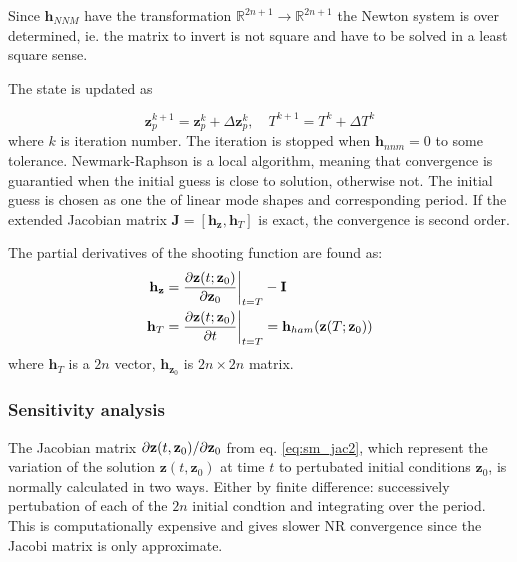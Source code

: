 Since $\bm h_{NNM}$ have the transformation $\mathbb{R}^{2n+1} \rightarrow
\mathbb{R}^{2n+1}$ the Newton system is over determined, ie. the matrix to
invert is not square and have to be solved in a least square sense.

The state is updated as

\begin{equation}
  \label{eq:sm_nr_update}
  \bm z^{k+1}_{p} = \bm z^k_{p} + \Delta \bm z^k_{p}, \quad
  T^{k+1} = T^k + \Delta T^k
\end{equation}
where $k$ is iteration number. The iteration is stopped when $\bm h_{nnm} = 0$
to some tolerance. Newmark-Raphson is a local algorithm, meaning that
convergence is guarantied when the initial guess is close to solution, otherwise
not. The initial guess is chosen as one the of linear mode shapes and
corresponding period. If the extended Jacobian matrix $\bm J = [\bm h_{\bm z},
\bm h_T] $ is exact, the convergence is second order.


The partial derivatives of the shooting function are found as:
\begin{align}
  \label{eq:sm_jac1}
  \bm h_{\bm{z}}&=
  \frac{\p \bm z(t; \bm z_0)}{\p \bm z_0}\bigg|_{t=T} - \bm I \\
  \bm h_T &=
  \frac{\p \bm z(t; \bm z_0)}{\p t}\bigg|_{t=T} =
  \bm h_{ham}(\bm z(T; \bm z_0))
  \label{eq:sm_jac2}
\end{align}
where $\bm h_{T}$ is a $2n$ vector, $\bm h_{\bm z_{0}}$ is $2n\times 2n$ matrix.



\subsubsection{Sensitivity analysis}
\label{sec:sm_sens_ana}

The Jacobian matrix $\p \bm z(t,\bm z_0) / \p \bm z_{0}$ from eq.
\eqref{eq:sm_jac2}, which represent the variation of the solution $\bm z(t,\bm
z_0)$ at time $t$ to pertubated initial conditions $\bm z_0$, is normally
calculated in two ways. Either by finite difference: successively pertubation of
each of the $2n$ initial condtion and integrating over the period. This is
computationally expensive and gives slower NR convergence since the Jacobi
matrix is only approximate.

